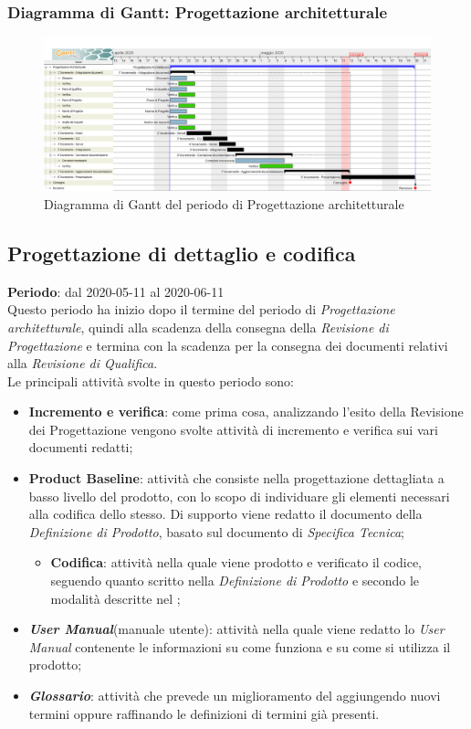 	\subsubsection{Diagramma di Gantt: Progettazione architetturale}
		\begin{figure}[h]
			\centering
			\includegraphics[width=1.1\textwidth]{./res/img/DiagrammiGantt/prog_arch_gantt.png}
			\caption{Diagramma di Gantt del periodo di Progettazione architetturale}
		\end{figure}
\newpage
\subsection{Progettazione di dettaglio e codifica}
\textbf{Periodo}: dal 2020-05-11 al 2020-06-11 \\
Questo periodo ha inizio dopo il termine del periodo di \textit{Progettazione architetturale}, quindi alla scadenza della consegna della \textit{Revisione di Progettazione} e termina con la scadenza per la consegna dei documenti relativi alla \textit{Revisione di Qualifica}. \\
Le principali attività svolte in questo periodo sono:
\begin{itemize}
	\item \textbf{Incremento e verifica}: come prima cosa, analizzando l'esito della Revisione dei Progettazione vengono svolte attività di incremento e verifica sui vari documenti redatti;
	\item \textbf{Product Baseline}: attività che consiste nella progettazione dettagliata a basso livello del prodotto, con lo scopo di individuare gli elementi necessari alla codifica dello stesso. Di supporto viene redatto il documento della \textit{Definizione di Prodotto}, basato sul documento di \textit{Specifica Tecnica};
	\begin{itemize}
		\item \textbf{Codifica}: attività nella quale viene prodotto e verificato il codice, seguendo quanto scritto nella \textit{Definizione di Prodotto} e secondo le modalità descritte nel \PdQ{};
	\end{itemize}
	\item \textbf{\textit{User Manual}}(manuale utente): attività nella quale viene redatto lo \textit{User Manual} contenente le informazioni su come funziona e su come si utilizza il prodotto;
	\item \textbf{\textit{Glossario}}: attività che prevede un miglioramento del \Glossario aggiungendo nuovi termini oppure raffinando le definizioni di termini già presenti.
\end{itemize}

